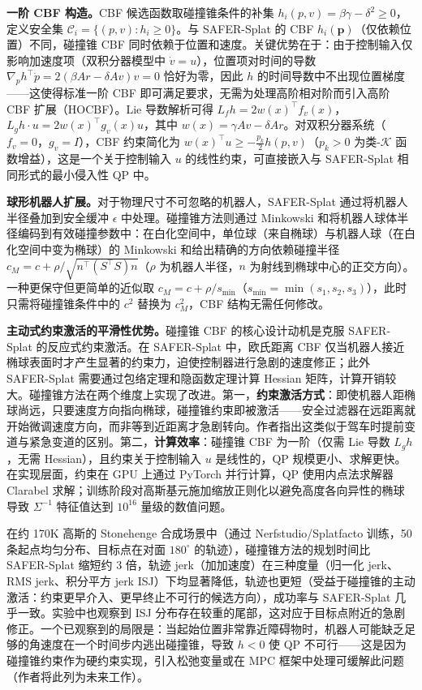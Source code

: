 \textbf{一阶 CBF 构造。}CBF 候选函数取碰撞锥条件的补集 $h_i(p,v) = \beta\gamma - \delta^2 \geq 0$，定义安全集 $\mathcal{C}_i = \{(p,v) : h_i \geq 0\}$。与 SAFER-Splat 的 CBF $h_i(\mathbf{p})$（仅依赖位置）不同，碰撞锥 CBF 同时依赖于位置和速度。关键优势在于：由于控制输入仅影响加速度项（双积分器模型中 $\dot{v} = u$），位置项对时间的导数 $\nabla_p h^\top \dot{p} = 2(\beta Ar - \delta Av)v = 0$ 恰好为零，因此 $h$ 的时间导数中不出现位置梯度——这使得标准一阶 CBF 即可满足要求，无需为处理高阶相对阶而引入高阶 CBF 扩展（HOCBF）。Lie 导数解析可得 $L_f h = 2w(x)^\top f_v(x)$，$L_g h \cdot u = 2w(x)^\top g_v(x) u$，其中 $w(x) = \gamma Av - \delta Ar$。对双积分器系统（$f_v = 0$，$g_v = I$），CBF 约束简化为 $w(x)^\top u \geq -\frac{p_k}{2}h(p,v)$（$p_k > 0$ 为类-$\mathcal{K}$ 函数增益），这是一个关于控制输入 $u$ 的线性约束，可直接嵌入与 SAFER-Splat 相同形式的最小侵入性 QP 中。

\textbf{球形机器人扩展。}对于物理尺寸不可忽略的机器人，SAFER-Splat 通过将机器人半径叠加到安全缓冲 $\epsilon$ 中处理。碰撞锥方法则通过 Minkowski 和将机器人球体半径编码到有效碰撞参数中：在白化空间中，单位球（来自椭球）与机器人球（在白化空间中变为椭球）的 Minkowski 和给出精确的方向依赖碰撞半径 $c_M = c + \rho/\sqrt{n^\top(S^\top S)n}$（$\rho$ 为机器人半径，$n$ 为射线到椭球中心的正交方向）。一种更保守但更简单的近似取 $c_M = c + \rho/s_{\min}$（$s_{\min} = \min(s_1,s_2,s_3)$），此时只需将碰撞锥条件中的 $c^2$ 替换为 $c_M^2$，CBF 结构无需任何修改。

\textbf{主动式约束激活的平滑性优势。}碰撞锥 CBF 的核心设计动机是克服 SAFER-Splat 的反应式约束激活。在 SAFER-Splat 中，欧氏距离 CBF 仅当机器人接近椭球表面时才产生显著的约束力，迫使控制器进行急剧的速度修正；此外 SAFER-Splat 需要通过包络定理和隐函数定理计算 Hessian 矩阵，计算开销较大。碰撞锥方法在两个维度上实现了改进。第一，\textbf{约束激活方式}：即使机器人距椭球尚远，只要速度方向指向椭球，碰撞锥约束即被激活——安全过滤器在远距离就开始微调速度方向，而非等到近距离才急剧转向。作者指出这类似于驾车时提前变道与紧急变道的区别。第二，\textbf{计算效率}：碰撞锥 CBF 为一阶（仅需 Lie 导数 $L_g h$，无需 Hessian），且约束关于控制输入 $u$ 是线性的，QP 规模更小、求解更快。在实现层面，约束在 GPU 上通过 PyTorch 并行计算，QP 使用内点法求解器 Clarabel 求解；训练阶段对高斯基元施加缩放正则化以避免高度各向异性的椭球导致 $\Sigma^{-1}$ 特征值达到 $10^{16}$ 量级的数值问题。

在约 170K 高斯的 Stonehenge 合成场景中（通过 Nerfstudio/Splatfacto 训练，50 条起点均匀分布、目标点在对面 $180^\circ$ 的轨迹），碰撞锥方法的规划时间比 SAFER-Splat 缩短约 3 倍，轨迹 jerk（加加速度）在三种度量（归一化 jerk、RMS jerk、积分平方 jerk ISJ）下均显著降低，轨迹也更短（受益于碰撞锥的主动激活：约束更早介入、更早终止不可行的候选方向），成功率与 SAFER-Splat 几乎一致。实验中也观察到 ISJ 分布存在较重的尾部，这对应于目标点附近的急剧修正。一个已观察到的局限是：当起始位置非常靠近障碍物时，机器人可能缺乏足够的角速度在一个时间步内逃出碰撞锥，导致 $h < 0$ 使 QP 不可行——这是因为碰撞锥约束作为硬约束实现，引入松弛变量或在 MPC 框架中处理可缓解此问题（作者将此列为未来工作）。


